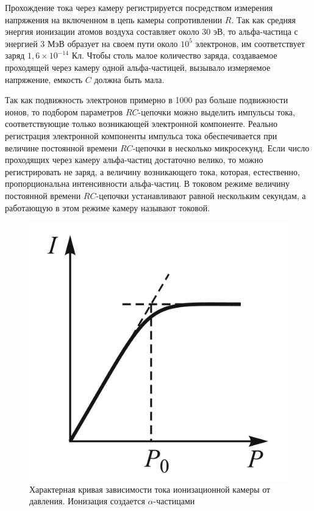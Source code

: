 \documentclass[a4paper, 12pt]{article}
\begin{document}
	Прохождение тока через камеру регистрируется посредством измерения напряжения на включенном в цепь камеры сопротивлении $ R $.
	Так как средняя энергия ионизации атомов воздуха составляет около 30 эВ, то альфа-частица с энергией 3 МэВ образует на своем пути около $ 10^5 $ электронов, им соответствует заряд $1,6 \times 10^{-14} $ Кл. Чтобы
	столь малое количество заряда, создаваемое проходящей через камеру одной альфа-частицей, вызывало измеряемое напряжение, емкость $ C $
	должна быть мала.
	
	Так как подвижность электронов примерно в 1000 раз больше подвижности ионов, то подбором параметров $ RC $-цепочки можно выделить импульсы тока, соответствующие только возникающей электронной компоненте. Реально регистрация электронной компоненты
	импульса тока обеспечивается при величине постоянной времени $ RC $-цепочки в несколько микросекунд.
	Если число проходящих через камеру альфа-частиц достаточно велико, то можно регистрировать не заряд, а величину возникающего тока, которая, естественно, пропорциональна интенсивности альфа-частиц. В
	токовом режиме величину постоянной времени $ RC $-цепочки устанавливают равной нескольким секундам, а работающую в этом режиме
	камеру называют токовой.
	
	\begin{figure}
		\includegraphics[width=\linewidth]{PotI}
		\caption{Характерная кривая зависимости
			тока ионизационной камеры от давления.
			Ионизация создается $ \alpha $-частицами}
		\label{ris PotI}
	\end{figure}
	
\end{document}
